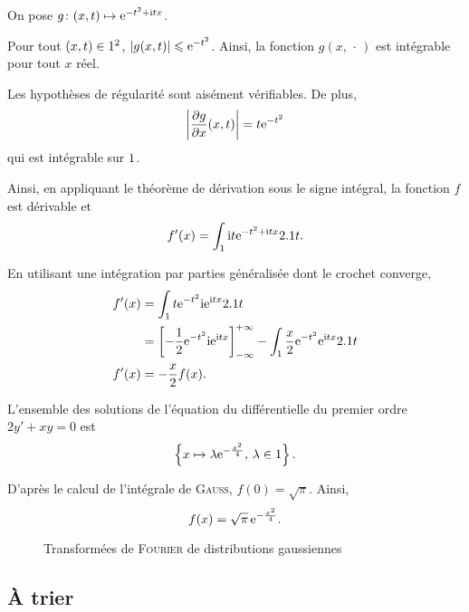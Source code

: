 \begin{solution} On pose $\fonctionligne[g]{(x, t)}{\e^{-t^2 + \i t x}}$.
\begin{reponses}
\item Pour tout $(x, t) \in \R^2$,  $\abs{g(x, t)} \leqslant \e^{-t^2}$. Ainsi, la fonction $g(x, \,\cdot\,)$ est intégrable pour tout $x$ réel.

\item Les hypothèses de régularité sont aisément vérifiables. De plus,
\[
\module{\frac{\partial g}{\partial x}(x, t)} = t \e^{-t^2}
\]
qui est intégrable sur $\R$.

Ainsi, en appliquant le théorème de dérivation sous le signe intégral, la fonction $f$ est dérivable et
\[
f'(x) = \int_\R \i t \e^{-t^2 + \i t x} \d t.
\]

\item En utilisant une intégration par parties généralisée dont le crochet converge,
\begin{align*}
f'(x) &= \int_\R t \e^{-t^2} \i \e^{\i t x} \d t \\
&= \left[-\frac{1}{2} \e^{-t^2} \i \e^{\i t x}\right]_{-\infty}^{+\infty} - \int_\R \frac{x}{2} \e^{-t^2} \e^{\i t x} \d t \\
f'(x) &= -\frac{x}{2} f(x).
\end{align*}

\item L'ensemble des solutions de l'équation du différentielle du premier ordre $2 y' + x y = 0$ est
\[
\left\{x \mapsto \lambda \e^{-\frac{x^2}{4}},\, \lambda \in \R\right\}.
\]

D'après le calcul de l'intégrale de \textsc{Gauss}, $f(0) = \sqrt{\pi}$. Ainsi,
\[
f(x) = \sqrt{\pi}\, \e^{-\frac{x^2}{4}}.
\]
\end{reponses}
\end{solution}

\begin{figure}
    \centering
    
    \caption{Transformées de \textsc{Fourier} de distributions gaussiennes }
\end{figure}


\subsection{À trier}

